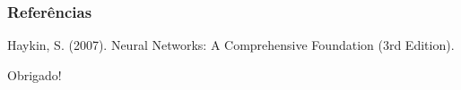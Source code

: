 \documentclass{beamer}
\begin{document}

%
%
%
%
%
%
%


\begin{frame}
\frametitle{Referências}
\footnotesize{
\begin{thebibliography}{99} %
Haykin, S. (2007). Neural Networks: A Comprehensive Foundation (3rd Edition).

\end{thebibliography}
}
\end{frame}


\begin{frame}
\Huge{\centerline{Obrigado!}}
\end{frame}

\end{document}
